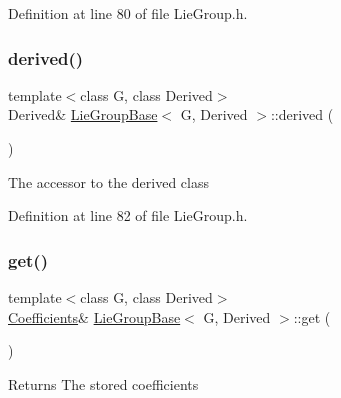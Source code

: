 Definition at line 80 of file Lie\+Group.\+h.

\hypertarget{class_lie_group_base_ac89ffa5560eb6a42586c69c6b35defe6}{}\label{class_lie_group_base_ac89ffa5560eb6a42586c69c6b35defe6} 
\subsubsection{\texorpdfstring{derived()}{derived()}\hspace{0.1cm}{\footnotesize\ttfamily [2/2]}}
{\footnotesize\ttfamily template$<$class G, class Derived$>$ \\
Derived\& \hyperlink{class_lie_group_base}{Lie\+Group\+Base}$<$ G, Derived $>$\+::derived (\begin{DoxyParamCaption}{ }\end{DoxyParamCaption})\hspace{0.3cm}{\ttfamily [inline]}}

The accessor to the derived class 

Definition at line 82 of file Lie\+Group.\+h.

\hypertarget{class_lie_group_base_a94dd7196c1e06c23ebcd5284982b2bc9}{}\label{class_lie_group_base_a94dd7196c1e06c23ebcd5284982b2bc9} 
\subsubsection{\texorpdfstring{get()}{get()}\hspace{0.1cm}{\footnotesize\ttfamily [1/2]}}
{\footnotesize\ttfamily template$<$class G, class Derived$>$ \\
\hyperlink{class_lie_group_base_abb840873afd0a4f54f9ad4265e1d0095}{Coefficients}\& \hyperlink{class_lie_group_base}{Lie\+Group\+Base}$<$ G, Derived $>$\+::get (\begin{DoxyParamCaption}{ }\end{DoxyParamCaption})\hspace{0.3cm}{\ttfamily [inline]}}

\begin{DoxyReturn}{Returns}
The stored coefficients 
\end{DoxyReturn}
\hypertarget{class_lie_group_base_a16ad337b62494de47bb79690a1831523}{}\label{class_lie_group_base_a16ad337b62494de47bb79690a1831523} 
